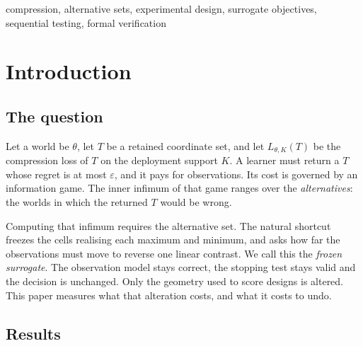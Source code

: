 \begin{IEEEkeywords}
compression, alternative sets, experimental design, surrogate objectives, sequential testing,
formal verification
\end{IEEEkeywords}

\section{Introduction}
\label{sec:intro}

\subsection{The question}

Let a world be $\theta$, let $T$ be a retained coordinate set, and let $L_{\theta,K}(T)$ be the
compression loss of $T$ on the deployment support $K$. A learner must return a $T$ whose
regret is at most $\varepsilon$, and it pays for observations. Its cost is governed by an
information game. The inner infimum of that game ranges over the \emph{alternatives}: the
worlds in which the returned $T$ would be wrong.

Computing that infimum requires the alternative set. The natural shortcut freezes the cells
realising each maximum and minimum, and asks how far the observations must move to reverse
one linear contrast. We call this the \emph{frozen surrogate}. The observation model stays
correct, the stopping test stays valid and the decision is unchanged. Only the geometry used
to score designs is altered. This paper measures what that alteration costs, and what it
costs to undo.

\subsection{Results}

